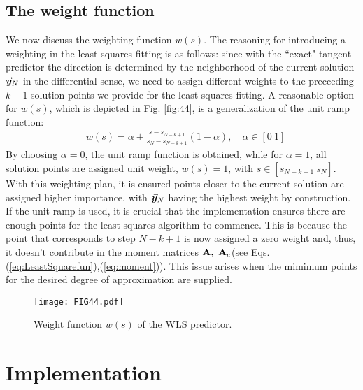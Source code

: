 \subsection{The weight function}\label{CH5-S2SS4}

We now discuss the weighting function $w(s)$. The reasoning for introducing a
weighting in the least squares fitting is as follows: since with
the ``exact" tangent predictor the direction is determined by the neighborhood 
of
the current solution $\vec{\bm{y}}_N$ in the differential sense, we need to assign
different weights to the precceding $k-1$ solution points we provide for the 
least squares fitting. A reasonable option for $w(s)$, which is depicted in 
Fig. \ref{fig:44}, is a generalization of the unit ramp function:
\begin{align}
	&w(s) = \alpha + \frac{s-s_{N-k+1}}{s_N-s_{N-k+1}}(1-\alpha)
	\label{eq:WeightFunction},\quad \alpha\in[0\ 1]
\end{align}
By choosing $\alpha=0$, the unit ramp function is obtained, while for
$\alpha=1$, all solution points are assigned unit weight, $w(s)=1$, with 
$s\in[s_{N-k+1}\ s_N]$.
With this weighting plan, it is
ensured points closer to the current solution are assigned higher importance,
with $\vec{\bm{y}}_N$ having the highest weight by construction. If the unit ramp is
used, it is crucial that the implementation ensures there are enough points for
the least squares algorithm to commence. This is because the point that
corresponds to step $N-k+1$ is now assigned a zero weight and, thus, it doesn't
contribute in the moment matrices $\bmat{A},\ \bmat{A}_c$(see Eqs.
(\ref{eq:LeastSquarefun}),(\ref{eq:moment})). This issue arises when the mimimum
points for the desired degree of approximation are supplied. 

\begin{figure}[t]
	\centering
	\texttt{[image: FIG44.pdf]}
	\caption{Weight function $w(s)$ of the WLS predictor.}
	\label{fig:FIG44}
\end{figure}


\section{Implementation}\label{CH5-S3}

